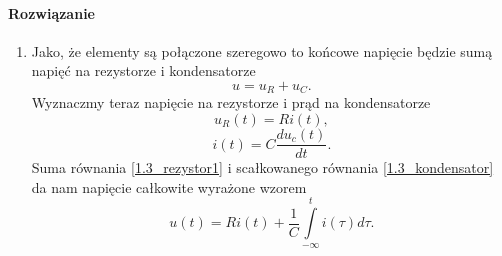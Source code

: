 \documentclass[12pt, a4paper]{article}
\begin{document}
\paragraph{Rozwiązanie}
\begin{enumerate}[label=\alph*)]
  \item Jako, że elementy są połączone szeregowo to końcowe napięcie będzie
        sumą napięć na rezystorze i kondensatorze
        $$
          u = u_R + u_C.
        $$
        Wyznaczmy teraz napięcie na rezystorze i prąd na kondensatorze
        \begin{equation}\label{1.3_rezystor1}
          u_R(t) = Ri(t),
        \end{equation}
        \begin{equation}\label{1.3_kondensator}
          i(t) = C\frac{du_c(t)}{dt}.
        \end{equation}
        Suma równania \ref{1.3_rezystor1} i scałkowanego równania \ref{1.3_kondensator}
        da nam napięcie całkowite wyrażone wzorem
        \begin{equation}\label{1.3_napiecie1}
          u(t) = Ri(t) + \frac{1}{C}\int\limits_{-\infty}^t i(\tau) d\tau.
        \end{equation}


\end{enumerate}
\end{document}
